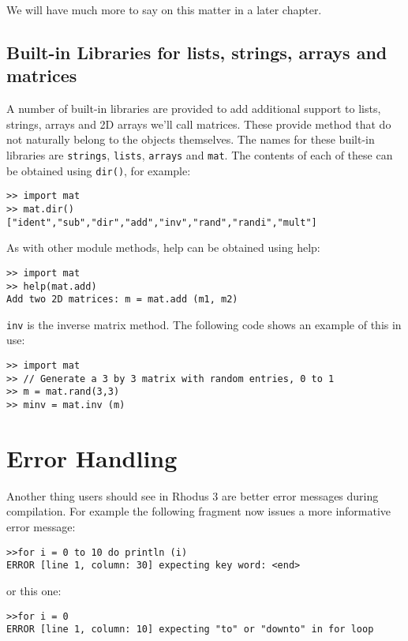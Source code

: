 We will have much more to say on this matter in a later chapter.

\subsection{Built-in Libraries for lists, strings, arrays and matrices}

A number of built-in libraries are provided to add additional support to lists, strings, arrays and 2D arrays we'll call matrices. These provide method that do not naturally belong to the objects themselves. The names for these built-in libraries are {\tt strings}, {\tt lists}, {\tt arrays} and {\tt mat}. The contents of each of these can be obtained using {\tt dir()}, for example:

\begin{lstlisting}
>> import mat
>> mat.dir()
["ident","sub","dir","add","inv","rand","randi","mult"]
\end{lstlisting}

As with other module methods, help can be obtained using help:

\begin{lstlisting}
>> import mat
>> help(mat.add)
Add two 2D matrices: m = mat.add (m1, m2)
\end{lstlisting}

{\tt inv} is the inverse matrix method. The following code shows an example of this in use:

\begin{lstlisting}
>> import mat
>> // Generate a 3 by 3 matrix with random entries, 0 to 1
>> m = mat.rand(3,3)
>> minv = mat.inv (m)
\end{lstlisting}

\section{Error Handling}

Another thing users should see in Rhodus 3 are better error messages during compilation. For example the following fragment now issues a more informative error message:

\begin{lstlisting}
>>for i = 0 to 10 do println (i)
ERROR [line 1, column: 30] expecting key word: <end>
\end{lstlisting}

or this one:

\begin{lstlisting}
>>for i = 0
ERROR [line 1, column: 10] expecting "to" or "downto" in for loop
\end{lstlisting}

